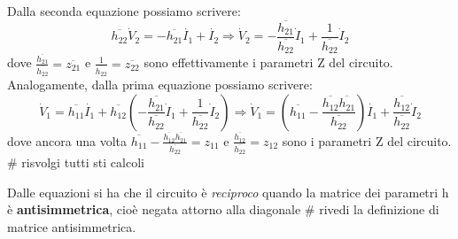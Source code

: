 \documentclass[a4paper,11pt]{article}
\begin{document}
Dalla seconda equazione possiamo scrivere:
$$
\overline{h_{22}} \dot{V}_2 = - \overline{h_{21}} \dot{I_1} + \dot{I_2} \Rightarrow \dot{V}_2 = -\frac{\overline{h_{21}}}{\overline{h_{22}}} \dot{I}_1 + \frac{1}{\overline{h_{22}}} \dot{I}_2 
$$
dove $\frac{\overline{h_{21}}}{\overline{h_{22}}} = \overline{z_{21}}$ e $\frac{1}{\overline{h_{22}}} = \overline{z_{22}}$ sono effettivamente i parametri Z del circuito.
Analogamente, dalla prima equazione possiamo scrivere:
$$
\dot{V}_1 = \overline{h_{11}} \dot{I_1} + \overline{h_{12}} \left(  -\frac{\overline{h_{21}}}{\overline{h_{22}}} \dot{I}_1 + \frac{1}{\overline{h_{22}}} \dot{I}_2  \right) \Rightarrow \dot{V}_1 = \left( \overline{h_{11}} - \frac{\overline{h_{12}}\overline{h_{21}}}{\overline{h_{22}}} \right) \dot{I_1} + \frac{\overline{h_{12}}}{\overline{h_{22}}} \dot{I}_2 
$$
dove ancora una volta $\overline{h_{11}} - \frac{\overline{h_{12}}\overline{h_{21}}}{\overline{h_{22}}} = z_{11}$ e $\frac{\overline{h_{12}}}{\overline{h_{22}}} = z_{12}$ sono i parametri Z del circuito. # risvolgi tutti sti calcoli

Dalle equazioni si ha che il circuito è \textit{reciproco} quando la matrice dei parametri h è \textbf{antisimmetrica}, cioè negata attorno alla diagonale # rivedi la definizione di matrice antisimmetrica.
\end{document}
